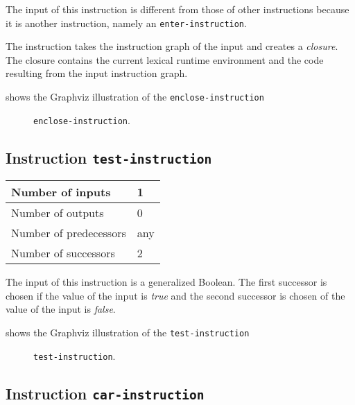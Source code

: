 The input of this instruction is different from those of other
instructions because it is another instruction, namely an
\texttt{enter-instruction}.

The instruction takes the instruction graph of the input and creates a
\emph{closure}.  The closure contains the current lexical runtime
environment and the code resulting from the input instruction graph.

 shows the Graphviz illustration of the
\texttt{enclose-instruction}

\begin{figure}
\begin{center}
\end{center}
\caption{\label{fig-enclose-instruction}
\texttt{enclose-instruction}.}
\end{figure}

\subsection{Instruction \texttt{test-instruction}}
\label{mir-instruction-test}

\begin{tabular}{|l|l|}
\hline
Number of inputs & 1\\
\hline
Number of outputs & 0\\
\hline
Number of predecessors & any\\
\hline
Number of successors & 2\\
\hline
\end{tabular}

The input of this instruction is a generalized Boolean.  The first
successor is chosen if the value of the input is \emph{true} and the
second successor is chosen of the value of the input is \emph{false}.

 shows the Graphviz illustration of the
\texttt{test-instruction}

\begin{figure}
\begin{center}
\end{center}
\caption{\label{fig-test-instruction}
\texttt{test-instruction}.}
\end{figure}

\subsection{Instruction \texttt{car-instruction}}
\label{mir-instruction-car}

